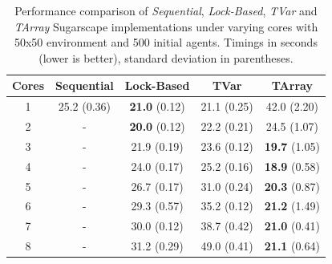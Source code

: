 \begin{table}
	\centering
  	\begin{tabular}{ c || c | c | c | c }
        Cores  & Sequential  & Lock-Based            & TVar         & TArray                \\ \hline \hline 
    		1      & 25.2 (0.36) & \textbf{21.0} (0.12)  & 21.1 (0.25)  & 42.0 (2.20)           \\ \hline
   		2      & -           & \textbf{20.0} (0.12)  & 22.2 (0.21)  & 24.5 (1.07)           \\ \hline
   		3      & -           & 21.9 (0.19)           & 23.6 (0.12)  & \textbf{19.7} (1.05)  \\ \hline
   		4      & -           & 24.0 (0.17)           & 25.2 (0.16)  & \textbf{18.9} (0.58)  \\ \hline
   		5      & -           & 26.7 (0.17)           & 31.0 (0.24)  & \textbf{20.3} (0.87)  \\ \hline
   		6      & -           & 29.3 (0.57)           & 35.2 (0.12)  & \textbf{21.2} (1.49)  \\ \hline
   		7      & -           & 30.0 (0.12)           & 38.7 (0.42)  & \textbf{21.0} (0.41)  \\ \hline
   		8      & -           & 31.2 (0.29)           & 49.0 (0.41)  & \textbf{21.1} (0.64)  \\ \hline \hline
   	\end{tabular}
 
  	\caption[Performance comparison of \textit{Sequential}, \textit{Lock-Based}, \textit{TVar} and \textit{TArray} Sugarscape implementations under varying cores with 50x50 environment and 500 initial agents]{Performance comparison of \textit{Sequential}, \textit{Lock-Based}, \textit{TVar} and \textit{TArray} Sugarscape implementations under varying cores with 50x50 environment and 500 initial agents. Timings in seconds (lower is better), standard deviation in parentheses.}
	\label{tab:sugarscape_varyingcores_constagents}
\end{table}

